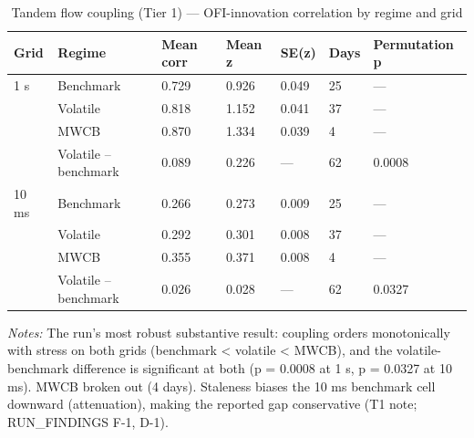 \begin{table}[htbp]\centering
\caption{Tandem flow coupling (Tier 1) — OFI-innovation correlation by regime and grid}
\label{tab:t4}
\small
\begin{tabular}{lllllll}
\toprule
Grid & Regime & Mean corr & Mean z & SE(z) & Days & Permutation p \\
\midrule
1 s & Benchmark & 0.729 & 0.926 & 0.049 & 25 & — \\
 & Volatile & 0.818 & 1.152 & 0.041 & 37 & — \\
 & MWCB & 0.870 & 1.334 & 0.039 & 4 & — \\
 & Volatile -- benchmark & 0.089 & 0.226 & — & 62 & 0.0008 \\
\midrule
10 ms & Benchmark & 0.266 & 0.273 & 0.009 & 25 & — \\
 & Volatile & 0.292 & 0.301 & 0.008 & 37 & — \\
 & MWCB & 0.355 & 0.371 & 0.008 & 4 & — \\
 & Volatile -- benchmark & 0.026 & 0.028 & — & 62 & 0.0327 \\
\bottomrule
\end{tabular}
\begin{minipage}{\linewidth}\vspace{2pt}\footnotesize\emph{Notes:} The run's most robust substantive result: coupling orders monotonically with stress on both grids (benchmark < volatile < MWCB), and the volatile-benchmark difference is significant at both (p = 0.0008 at 1 s, p = 0.0327 at 10 ms). MWCB broken out (4 days). Staleness biases the 10 ms benchmark cell downward (attenuation), making the reported gap conservative (T1 note; RUN\_FINDINGS F-1, D-1).\end{minipage}
\end{table}
